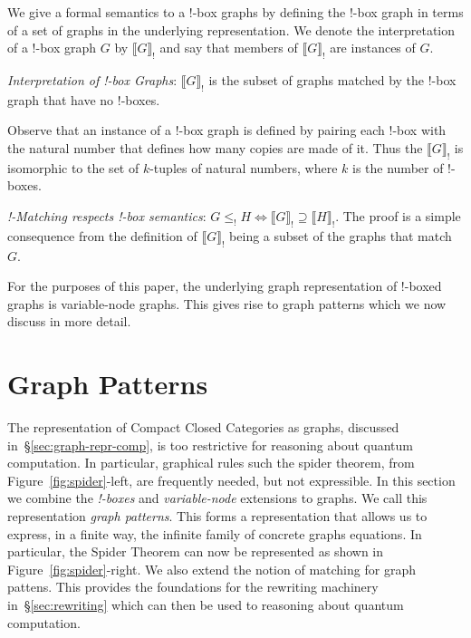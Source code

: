 \documentclass[runningheads]{llncs}
\newcommand{\binterp}[1]{\llbracket #1 \rrbracket_!}
\begin{document}
We give a formal semantics to a !-box graphs by
defining the !-box graph in terms of a set of graphs in the underlying
representation. We denote the interpretation of a !-box graph $G$ by
$\binterp{G}$ and say that members of $\binterp{G}$ are instances of
$G$.

\begin{definition}
  \emph{Interpretation of !-box Graphs}: $\binterp{G}$ is the subset
  of graphs matched by the !-box graph that have no !-boxes.
\end{definition}

Observe that an instance of a !-box graph is defined by pairing each
!-box with the natural number that defines how many copies are made of
it. Thus the $\binterp{G}$ is isomorphic to the set of $k$-tuples of
natural numbers, where $k$ is the number of !-boxes.

\begin{theorem}
\label{thm:bang-box-respect}
\emph{!-Matching respects !-box semantics}: $G \leq_! H
\Leftrightarrow \binterp{G} \supseteq \binterp{H}$. The proof is a
simple consequence from the definition of $\binterp{G}$ being a subset
of the graphs that match $G$.
\end{theorem}

For the purposes of this paper, the underlying graph representation of
!-boxed graphs is variable-node graphs. This gives rise to graph
patterns which we now discuss in more detail.

\section{Graph Patterns}
\label{sec:patterns}

The representation of Compact Closed Categories as graphs, discussed
in~\S\ref{sec:graph-repr-comp}, is too restrictive for reasoning about
quantum computation. In particular, graphical rules such the spider
theorem, from Figure~\ref{fig:spider}-left, are frequently needed, but
not expressible. In this section we combine the {\em !-boxes} and {\em
  variable-node} extensions to graphs. We call this representation
\emph{graph patterns}. This forms a representation that allows us to
express, in a finite way, the infinite family of concrete graphs
equations. In particular, the Spider Theorem can now be represented as
shown in Figure~\ref{fig:spider}-right. We also extend the notion of
matching for graph pattens.
This provides the foundations for the rewriting machinery
in~\S\ref{sec:rewriting} which can then be used to reasoning about
quantum computation.
\end{document}
